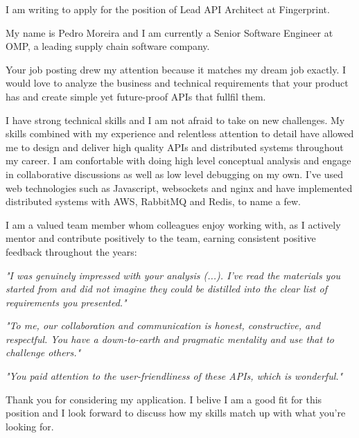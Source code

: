 I am writing to apply for the position of Lead API Architect at Fingerprint.

My name is Pedro Moreira and I am currently a Senior Software Engineer at OMP, a leading supply chain software company.

Your job posting drew my attention because it matches my dream job exactly. I would love to analyze the business and technical requirements that your product has and create simple yet future-proof APIs that fullfil them.

I have strong technical skills and I am not afraid to take on new challenges. My skills combined with my experience and relentless attention to detail have allowed me to design and deliver high quality APIs and distributed systems throughout my career. I am confortable with doing high level conceptual analysis and engage in collaborative discussions as well as low level debugging on my own. I've used web technologies such as Javascript, websockets and nginx and have implemented distributed systems with AWS, RabbitMQ and Redis, to name a few.

I am a valued team member whom colleagues enjoy working with, as I actively mentor and contribute positively to the team, earning consistent positive feedback throughout the years:

\emph{"I was genuinely impressed with your analysis (...). I've read the materials you started from and did not imagine they could be distilled into the clear list of requirements you presented."}

\emph{"To me, our collaboration and communication is honest, constructive, and respectful. You have a down-to-earth and pragmatic mentality and use that to challenge others."}

\emph{"You paid attention to the user-friendliness of these APIs, which is wonderful."}

Thank you for considering my application. I belive I am a good fit for this position and I look forward to discuss how my skills match up with what you're looking for.
